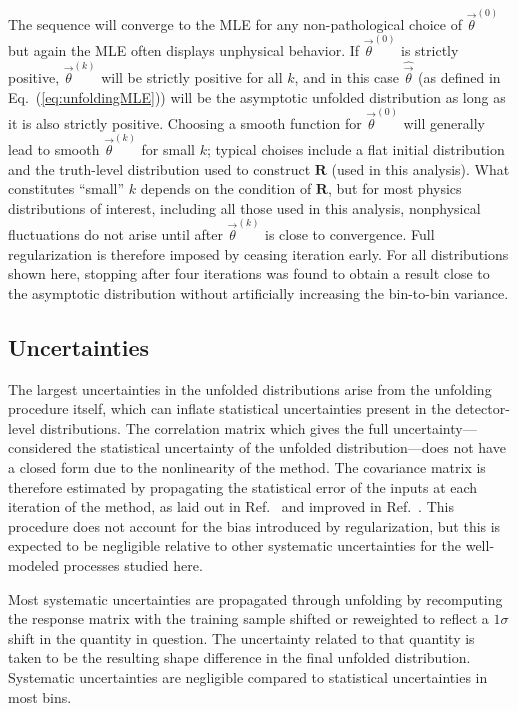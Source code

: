 The sequence will converge to the MLE for any non-pathological choice of $\vec{\theta}^{(0)}$~\cite{vardi1985} but again the MLE often displays unphysical behavior.
If $\vec{\theta}^{(0)}$ is strictly positive, $\vec{\theta}^{(k)}$ will be strictly positive for all $k$, and in this case $\hat{\vec{\theta}}$ (as defined in Eq.~(\ref{eq:unfoldingMLE})) will be the asymptotic unfolded distribution as long as it is also strictly positive.
Choosing a smooth function for $\vec{\theta}^{(0)}$ will generally lead to smooth $\vec{\theta}^{(k)}$ for small $k$; typical choises include a flat initial distribution and the truth-level distribution used to construct $\mathbf{R}$ (used in this analysis).
What constitutes ``small'' $k$ depends on the condition of $\mathbf{R}$, but for most physics distributions of interest, including all those used in this analysis, nonphysical fluctuations do not arise until after $\vec{\theta}^{(k)}$ is close to convergence.
Full regularization is therefore imposed by ceasing iteration early.
For all distributions shown here, stopping after four iterations was found to obtain a result close to the asymptotic distribution without artificially increasing the bin-to-bin variance.

\subsection{Uncertainties}

The largest uncertainties in the unfolded distributions arise from the unfolding procedure itself, which can inflate statistical uncertainties present in the detector-level distributions.
The correlation matrix which gives the full uncertainty---considered the statistical uncertainty of the unfolded distribution---does not have a closed form due to the nonlinearity of the method.
The covariance matrix is therefore estimated by propagating the statistical error of the inputs at each iteration of the method, as laid out in Ref.~\cite{DAgostini:1994fjx} and improved in Ref.~\cite{Adye:2011gm}.
This procedure does not account for the bias introduced by regularization, but this is expected to be negligible relative to other systematic uncertainties for the well-modeled processes studied here.

Most systematic uncertainties are propagated through unfolding by recomputing the response matrix with the training sample shifted or reweighted to reflect a $1\sigma$ shift in the quantity in question.
The uncertainty related to that quantity is taken to be the resulting shape difference in the final unfolded distribution.
Systematic uncertainties are negligible compared to statistical uncertainties in most bins.


